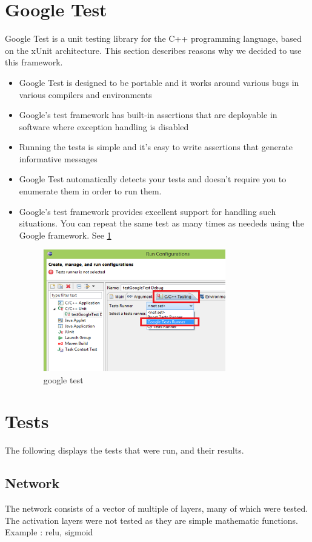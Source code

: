 \documentclass[parskip=full]{scrartcl}
\begin{document}
\section {Google Test}
Google Test is a unit testing library for the C++ programming language, based on the xUnit architecture. This section describes reasons why we decided to use this framework.
\begin{itemize}
	\item  Google Test is designed to be portable and it works around various bugs in various compilers and environments
	\item  Google's test framework has built-in assertions that are deployable in software where exception handling is disabled
	\item  Running the tests is simple and it’s easy to write assertions that generate informative messages
	\item  Google Test automatically detects your tests and doesn’t require you to enumerate them in order to run them.
	\item  Google's test framework provides excellent support for handling such situations. You can repeat the same test as many times as neededs using the Google framework. See \ref{fig:google_test} 
	
\begin{figure}[h]
	\centering
	\includegraphics[width=0.75\textwidth]{google_test}
	\caption{google test}
	\label{fig:google_test}
\end{figure}

\end{itemize}
\pagebreak
\section {Tests}
The following displays the tests that were run, and their results.
\pagebreak
\subsection{Network}
The network consists of a vector of multiple of layers, many of which were tested. The activation layers were not tested as they are simple mathematic functions. Example : relu, sigmoid
\end{document}
